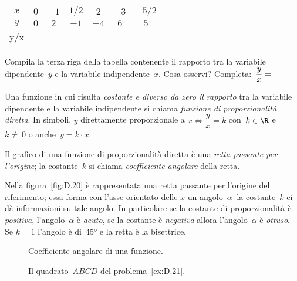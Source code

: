 \begin{center}
 \begin{tabular}{ccccccc}
 \toprule
 \(x\) & \(0\) & \(-1\) & \( 1/2\) & \(2\) & \(-3\) & \(-5/2\)\\
 \(y\) & \(0\) & \(2\) & \(-1\) & \(-4\) & \(6\) & \(5\)\\
 \midrule
 y/x& & & & & & \\
 \bottomrule
 \end{tabular}
\end{center}
Compila la terza riga della tabella contenente il rapporto tra la variabile 
dipendente~\(y\) e la variabile indipendente~\(x\).
Cosa osservi? Completa:~\(\dfrac{y}{x}=\dotfill\)
\begin{definizione}
 Una funzione in cui risulta \emph{costante e diverso da zero il rapporto} 
tra 
la variabile dipendente e la variabile indipendente
 si chiama \emph{funzione di proporzionalità diretta}. In simboli, \(y\) 
direttamente proporzionale a
\(x \Leftrightarrow \dfrac{y}{x}=k\) con~\(k\in \R\) e~\(k\neq~0\) o 
anche~\(y=k\cdot x\).
\end{definizione}
Il grafico di una funzione di proporzionalità diretta è una \emph{retta 
passante 
per l'origine};
la costante~\(k\) si chiama \emph{coefficiente angolare} della retta.

Nella figura~\ref{fig:D.20} è rappresentata una retta passante per l'origine 
del 
riferimento; essa forma con l'asse orientato delle
\(x\) un angolo~\(\alpha~\) la costante~\(k\) ci dà informazioni su tale 
angolo.
In particolare se la costante di proporzionalità è \emph{positiva}, 
l'angolo~\(\alpha\) è \emph{acuto}, se la costante è
\emph{negativa} allora l'angolo~\(\alpha\) è \emph{ottuso}. Se \(k=1\) 
l'angolo 
è 
di~45° e la retta è la bisettrice.

\begin{inaccessibleblock}
 \begin{figure}[h]
 \begin{minipage}[t]{.45\textwidth}
  \centering
  \caption{Coefficiente angolare di una funzione.}\label{fig:D.20}
 \end{minipage}\hfil
 \begin{minipage}[t]{.45\textwidth}
  \centering
  \caption{Il quadrato~\(ABCD\) del problema~\ref{ex:D.21}.}\label{fig:D.21}
 \end{minipage}
\end{figure}
\end{inaccessibleblock}

